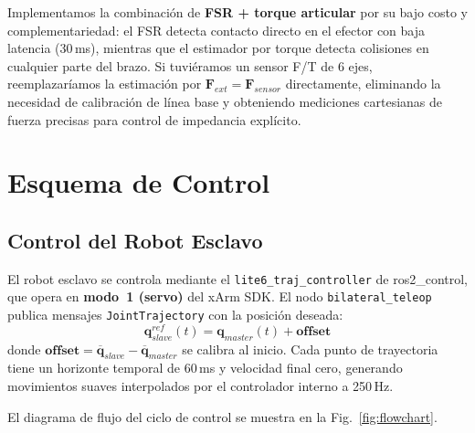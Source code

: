 \documentclass[journal,10pt,twoside]{IEEEtran}
\begin{document}
Implementamos la combinación de \textbf{FSR + torque articular} por su
bajo costo y complementariedad: el FSR detecta contacto directo en el
efector con baja latencia (30\,ms), mientras que el estimador por torque
detecta colisiones en cualquier parte del brazo. Si tuviéramos un
sensor F/T de 6 ejes, reemplazaríamos la estimación por
$\bm{F}_{ext}=\bm{F}_{sensor}$ directamente, eliminando la necesidad
de calibración de línea base y obteniendo mediciones cartesianas
de fuerza precisas para control de impedancia explícito.

\section{Esquema de Control}
\label{sec:control}

\subsection{Control del Robot Esclavo}


El robot esclavo se controla mediante el
\texttt{lite6\_traj\_controller} de ros2\_control, que opera en
\textbf{modo~1 (servo)} del xArm SDK. El nodo
\texttt{bilateral\_teleop} publica mensajes \texttt{JointTrajectory}
con la posición deseada:
\begin{equation}
  \bm{q}_{slave}^{ref}(t) = \bm{q}_{master}(t) + \bm{offset}
  \label{eq:slave_ref}
\end{equation}
donde $\bm{offset}=\overline{\bm{q}}_{slave}-\overline{\bm{q}}_{master}$
se calibra al inicio. Cada punto de trayectoria tiene un horizonte
temporal de 60\,ms y velocidad final cero, generando movimientos
suaves interpolados por el controlador interno a 250\,Hz.

El diagrama de flujo del ciclo de control se muestra en
la Fig.~\ref{fig:flowchart}.
\end{document}
